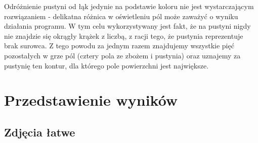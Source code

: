 \documentclass[a4paper]{article}
\begin{document}
Odróżnienie pustyni od łąk jedynie na podstawie koloru nie jest wystarczającym rozwiązaniem - delikatna różnica w oświetleniu pól może zaważyć o wyniku działania programu. W tym celu wykorzystywany jest fakt, że na pustyni nigdy nie znajdzie się okrągły krążek z liczbą, z racji tego, że pustynia reprezentuje brak surowca. Z tego powodu za jednym razem znajdujemy wszystkie pięć pozostałych w grze pól (cztery pola ze zbożem i pustynia) oraz uznajemy za pustynię ten kontur, dla którego pole powierzchni jest największe.
      
\section{Przedstawienie wyników}
    \subsection{Zdjęcia łatwe}
    
\end{document}

